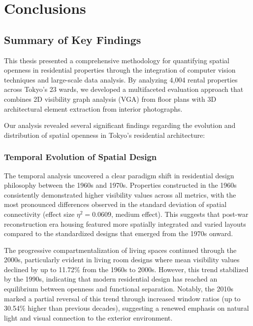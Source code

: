 \chapter{Conclusions}

\section{Summary of Key Findings}

This thesis presented a comprehensive methodology for quantifying spatial openness in residential 
properties through the integration of computer vision techniques and large-scale data analysis. By 
analyzing 4,004 rental properties across Tokyo's 23 wards, we developed a multifaceted evaluation 
approach that combines 2D visibility graph analysis (VGA) from floor plans with 3D architectural 
element extraction from interior photographs.

Our analysis revealed several significant findings regarding the evolution and distribution of 
spatial openness in Tokyo's residential architecture:

\subsection{Temporal Evolution of Spatial Design}

The temporal analysis uncovered a clear paradigm shift in residential design philosophy between the 
1960s and 1970s. Properties constructed in the 1960s consistently demonstrated higher visibility values 
across all metrics, with the most pronounced differences observed in the standard deviation of 
spatial connectivity (effect size $\eta^2 = 0.0609$, medium effect). This suggests that post-war 
reconstruction era housing featured more spatially integrated and varied layouts compared to the 
standardized designs that emerged from the 1970s onward.

The progressive compartmentalization of living spaces continued through the 2000s, particularly 
evident in living room designs where mean visibility values declined by up to 11.72\% from the 1960s to 
2000s. However, this trend stabilized by the 1990s, indicating that modern residential design has 
reached an equilibrium between openness and functional separation. Notably, the 2010s marked a 
partial reversal of this trend through increased window ratios (up to 30.54\% higher than previous 
decades), suggesting a renewed emphasis on natural light and visual connection to the exterior 
environment.

